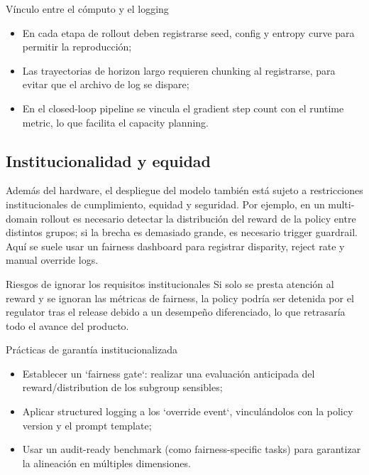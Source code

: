 \documentclass[a4paper]{article}
\begin{document}
\begin{importantbox}{Vínculo entre el cómputo y el logging}
\begin{itemize}
    \item En cada etapa de rollout deben registrarse seed, config y entropy curve para permitir la reproducción;
    \item Las trayectorias de horizon largo requieren chunking al registrarse, para evitar que el archivo de log se dispare;
    \item En el closed-loop pipeline se vincula el gradient step count con el runtime metric, lo que facilita el capacity planning.
\end{itemize}
\end{importantbox}

\subsection{Institucionalidad y equidad}
Además del hardware, el despliegue del modelo también está sujeto a restricciones institucionales de cumplimiento, equidad y seguridad. Por ejemplo, en un multi-domain rollout es necesario detectar la distribución del reward de la policy entre distintos grupos; si la brecha es demasiado grande, es necesario trigger guardrail. Aquí se suele usar un fairness dashboard para registrar disparity, reject rate y manual override logs.

\begin{warningbox}{Riesgos de ignorar los requisitos institucionales}
Si solo se presta atención al reward y se ignoran las métricas de fairness, la policy podría ser detenida por el regulator tras el release debido a un desempeño diferenciado, lo que retrasaría todo el avance del producto.
\end{warningbox}

\begin{knowledgebox}{Prácticas de garantía institucionalizada}
\begin{itemize}
    \item Establecer un `fairness gate`: realizar una evaluación anticipada del reward/distribution de los subgroup sensibles;
    \item Aplicar structured logging a los `override event`, vinculándolos con la policy version y el prompt template;
    \item Usar un audit-ready benchmark (como fairness-specific tasks) para garantizar la alineación en múltiples dimensiones.
\end{itemize}
\end{knowledgebox}
\end{document}
